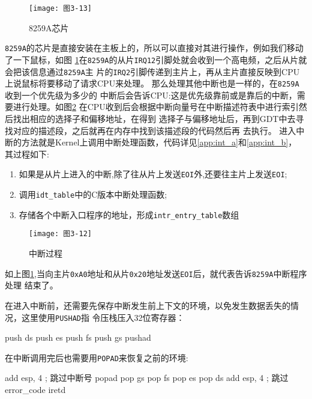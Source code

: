 \begin{figure}[H]
  \centering
  \texttt{[image: 图3-13]}
  \caption{8259A芯片}
  \label{fig:8259A}
\end{figure}

\texttt{8259A}的芯片是直接安装在主板上的，所以可以直接对其进行操作，例如我们移动了一下鼠标，如图
\ref{fig:8259A}在\texttt{8259A}的从片\texttt{IRQ12}引脚处就会收到一个高电频，之后从片就会把该信息通过\texttt{8259A}主
片的\texttt{IRQ2}引脚传递到主片上，再从主片直接反映到CPU上说鼠标将要移动了请求CPU来处理。
那么处理其他中断也是一样的，在\texttt{8259A}收到一个优先级为多少的
中断后会告诉CPU:这是优先级靠前或是靠后的中断，需要进行处理。如图\ref{fig:interrupt_a}
在CPU收到后会根据中断向量号在中断描述符表中进行索引然后找出相应的选择子和偏移地址，在得到
选择子与偏移地址后，再到GDT中去寻找对应的描述段，之后就再在内存中找到该描述段的代码然后再
去执行。
进入中断的方法就是Kernel上调用中断处理函数，代码详见\ref{app:int_a}和\ref{app:int_b}，
其过程如下:

\begin{enumerate}
\item 如果是从片上进入的中断,除了往从片上发送\texttt{EOI}外,还要往主片上发送\texttt{EOI};
\item 调用\texttt{idt\_table}中的C版本中断处理函数;
\item 存储各个中断入口程序的地址，形成\texttt{intr\_entry\_table}数组
\end{enumerate}

\begin{figure}[H]
  \centering
  \texttt{[image: 图3-12]}
  \caption{中断过程}
  \label{fig:interrupt_a}
\end{figure}

如上图\ref{fig:8259A},当向主片\texttt{0xA0}地址和从片\texttt{0x20}地址发送\texttt{EOI}后，就代表告诉\texttt{8259A}中断程序处理
结束了。

在进入中断前，还需要先保存中断发生前上下文的环境，以免发生数据丢失的情况，这里使用\texttt{PUSHAD}指
令压栈压入32位寄存器：
\begin{codeblock}
\begin{nasmcode}
   push ds
   push es
   push fs
   push gs
   pushad
\end{nasmcode}  
\end{codeblock}

在中断调用完后也需要用\texttt{POPAD}来恢复之前的环境:
\begin{codeblock}
\begin{nasmcode}
add esp, 4    ; 跳过中断号
   popad
   pop gs
   pop fs
   pop es
   pop ds
   add esp, 4 ; 跳过error_code
   iretd
\end{nasmcode}  
\end{codeblock}

